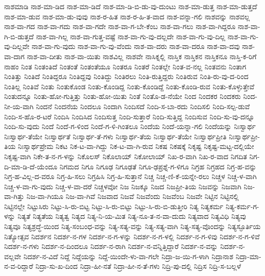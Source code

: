 {ನಾಶಮಾಡಿ
ನಾಶ-ಮಾ-ಡಿದ
ನಾಶ-ಮಾ-ಡಿದೆ
ನಾಶ-ಮಾ-ಡಿ-ಬಿ-ಡು-ವು-ದುಂಟು
ನಾಶ-ಮಾ-ಡುತ್ತ
ನಾಶ-ಮಾ-ಡುತ್ತದೆ
ನಾಶ-ಮಾ-ಡುವ
ನಾಶ-ಮಾ-ಡು-ವುವು
ನಾಶ-ರ-ಹಿತ
ನಾಶ-ರ-ಹಿ-ತ-ವಾದ
ನಾಶ-ವನ್ನಾ-ಗಲಿ
ನಾಶವನ್ನು
ನಾಶವಲ್ಲ
ನಾಶ-ವಾ-ಗದ
ನಾಶ-ವಾ-ಗದು
ನಾಶ-ವಾ-ಗದೇ
ನಾಶ-ವಾ-ಗ-ಬೇ-ಕೆಂಬ
ನಾಶ-ವಾ-ಗಲು
ನಾಶ-ವಾ-ಗಿದ್ದರೂ
ನಾಶ-ವಾ-ಗಿ-ಬಿ-ಡುತ್ತದೆ
ನಾಶ-ವಾ-ಗಿಲ್ಲ
ನಾಶ-ವಾ-ಗುತ್ತ-ವಷ್ಟೆ
ನಾಶ-ವಾ-ಗು-ವು-ದಲ್ಲದೇ
ನಾಶ-ವಾ-ಗು-ವು-ದಿಲ್ಲ
ನಾಶ-ವಾ-ಗು-ವು-ದಿಲ್ಲವೇ
ನಾಶ-ವಾ-ಗು-ವುದು
ನಾಶ-ವಾ-ಗು-ವು-ವೆಂದು
ನಾಶ-ವಾ-ದರು
ನಾಶ-ವಾ-ದರೂ
ನಾಶ-ವಾ-ದವು
ನಾಶ-ವಾ-ದಾಗ
ನಾಶ-ವಾ-ದೀತು
ನಾಶ-ವಾ-ಯಿತು
ನಾಶವಿಲ್ಲ
ನಾಶವೇ
ನಾಸಿಕ್ನಲ್ಲಿ
ನಾಸ್ತಿಕ
ನಾಸ್ತಿಕನ
ನಾಸ್ತಿಕನೂ
ನಾಸ್ತಿ-ಕ-ರಿಗೆ
ನಾಹಂ
ನಿಂತ
ನಿಂತಂತಿದೆ
ನಿಂತಂತೆ
ನಿಂತಂತೆಯೂ
ನಿಂತರೂ
ನಿಂತರೆ
ನಿಂತಲ್ಲೇ
ನಿಂತ-ವ-ನಲ್ಲ
ನಿಂತವನು
ನಿಂತಾಗ
ನಿಂತಿತ್ತು
ನಿಂತಿದೆ
ನಿಂತಿದ್ದರೂ
ನಿಂತಿದ್ದವು
ನಿಂತಿದ್ದು
ನಿಂತಿರಲು
ನಿಂತಿ-ರುತ್ತಿದ್ದರು
ನಿಂತಿರುವ
ನಿಂತಿ-ರು-ವು-ದ-ರಿಂದ
ನಿಂತಿಲ್ಲ
ನಿಂತಿವೆ
ನಿಂತು
ನಿಂತುಕೊಂಡ
ನಿಂತು-ಕೊಂಡಿದ್ದ
ನಿಂತು-ಕೊಂಡಿದ್ದೆ
ನಿಂತು-ಕೊಂಡಿ-ರುವ
ನಿಂತು-ಕೊಳ್ಳುತ್ತೇವೆ
ನಿಂತುದನ್ನೂ
ನಿಂತು-ಹೋ-ಗುತ್ತಿತ್ತು
ನಿಂತು-ಹೋ-ಯಿತು
ನಿಂತೆ
ನಿಂತೊ-ಡ-ನೆಯೇ
ನಿಂದ
ನಿಂದಕರ
ನಿಂದಕರು
ನಿಂದ-ನೀ-ಯ-ವಾಗಿ
ನಿಂದನೆ
ನಿಂದನೆಯ
ನಿಂದಲೂ
ನಿಂದಾಗಿ
ನಿಂದಿಸದೆ
ನಿಂದಿ-ಸ-ಬಾ-ರದು
ನಿಂದಿಸಲಿ
ನಿಂದಿ-ಸಲ್ಪ-ಡುವೆ
ನಿಂದಿ-ಸ-ಹೊ-ರ-ಟರೆ
ನಿಂದಿಸಿ
ನಿಂದಿಸಿದ
ನಿಂದಿಸುತ್ತ
ನಿಂದಿ-ಸುತ್ತಾರೆ
ನಿಂದಿ-ಸುತ್ತಿದ್ದ
ನಿಂದಿಸುವ
ನಿಂದಿ-ಸು-ವು-ದನ್ನೂ
ನಿಂದಿ-ಸು-ವುದು
ನಿಂದೆ
ನಿಂದೆ-ಗ-ಳಿಂದ
ನಿಂದೆ-ಗ-ಳಿ-ಗಿಂತಲೂ
ನಿಂದೆಯ
ನಿಂದೆ-ಯನ್ನಾ-ಗಲಿ
ನಿಂದೆಯನ್ನು
ನಿಃಸ್ವಾರ್ಥ
ನಿಃಸ್ವಾರ್ಥ-ತೆಯೇ
ನಿಃಸ್ವಾರ್ಥತೆ
ನಿಃಸ್ವಾರ್ಥ-ತೆ-ಗಳು
ನಿಃಸ್ವಾರ್ಥ-ತೆಯ
ನಿಃಸ್ವಾರ್ಥ-ತೆಯೇ
ನಿಃಸ್ವಾರ್ಥಪ್ರೀತಿ
ನಿಃಸ್ವಾರ್ಥಪ್ರೀ-ತಿಯ
ನಿಃಸ್ವಾರ್ಥಪ್ರೇಮ
ನಿಕಟ
ನಿಕ-ಟ-ವಾ-ಗಿದ್ದು
ನಿಕ-ಟ-ವಾ-ಗಿ-ರುವ
ನಿಕಷ
ನಿಕಷಕ್ಕೆ
ನಿಕೃಷ್ಟ
ನಿಕೃಷ್ಟ-ಮಟ್ಟ-ದಲ್ಲಿಯೇ
ನಿಕೃಷ್ಟ-ವಾಗಿ
ನಿಕೇ-ತ-ನ-ಗ-ಳನ್ನು
ನಿಕೊಲಸ್
ನಿಕೊಲಾಯ್
ನಿಕೋಲಾಯ್
ನಿಖ-ರ-ವಾಗಿ
ನಿಖ-ರ-ವಾದ
ನಿಗದಿತ
ನಿಗ-ದಿ-ಮಾ-ಡಿ-ದೆ-ಯೆಂದೂ
ನಿಗಮದ
ನಿಗೂ
ನಿಗೂಢ
ನಿಗೂಢತೆ
ನಿಗೂ-ಢಪ್ರಶ್ನೆ-ಗ-ಳಿಗೂ
ನಿಗ್ರಹ
ನಿಗ್ರಹದ
ನಿಗ್ರ-ಹ-ವನ್ನು
ನಿಗ್ರ-ಹ-ವಿಲ್ಲ-ದ-ವರೂ
ನಿಗ್ರ-ಹಿ-ಸಲು
ನಿಗ್ರಹಿಸಿ
ನಿಗ್ರ-ಹಿ-ಸುತ್ತಾನೆ
ನಿಚ್ಚ
ನಿಚ್ಚ-ಣಿ-ಕೆ-ಯನ್ನೇ-ರಲು
ನಿಚ್ಚಳ
ನಿಚ್ಚ-ಳ-ವಾಗಿ
ನಿಚ್ಚ-ಳ-ವಾ-ಗು-ವುದು
ನಿಚ್ಚ-ಳ-ವಾ-ದರೆ
ನಿಚ್ಚಳವೋ
ನಿಜ
ನಿಜಕ್ಕೂ
ನಿಜದ
ನಿಜಪ್ರೀ-ತಿಯ
ನಿಜವನ್ನು
ನಿಜವಾಗಿ
ನಿಜ-ವಾ-ಗಿತ್ತು
ನಿಜ-ವಾ-ಗಿಯೂ
ನಿಜ-ವಾ-ಗಿವೆ
ನಿಜವಾದ
ನಿಜವೆ
ನಿಜವೆಂದು
ನಿಜವೆಂಬ
ನಿಜವೇ
ನಿಟ್ಟಿನ
ನಿಟ್ಟಿನಲ್ಲಿ
ನಿಟ್ಟಿನಲ್ಲೇ
ನಿಟ್ಟುಸಿರು
ನಿಟ್ಟು-ಸಿ-ರು-ಬಿಟ್ಟ
ನಿಟ್ಟು-ಸಿ-ರು-ಬಿಟ್ಟು
ನಿಟ್ಟು-ಸಿ-ರು-ಬಿ-ಡುತ್ತೀರಿ
ನಿತ್ಯ
ನಿತ್ಯಕರ್ಮ
ನಿತ್ಯ-ಕರ್ಮ-ಗ-ಳನ್ನು
ನಿತ್ಯತೆ
ನಿತ್ಯತೆಯ
ನಿತ್ಯತ್ವ
ನಿತ್ಯದ
ನಿತ್ಯ-ನಿ-ಯ-ಮಿತ
ನಿತ್ಯ-ನೂ-ತ-ನ-ವಾ-ದುದು
ನಿತ್ಯವಾದ
ನಿತ್ಯವಿಧಿ
ನಿತ್ಯವು
ನಿತ್ಯವೂ
ನಿತ್ಯಶ್ರದ್ಧೆ-ಯಿಂದ
ನಿತ್ಯ-ಸಂಬಂಧ-ವನ್ನು
ನಿತ್ಯ-ಸತ್ಯ-ವನ್ನು
ನಿತ್ಯ-ಸತ್ಯ-ವಾಗಿ
ನಿತ್ಯ-ಸತ್ಯ-ವೊಂದನ್ನು
ನಿತ್ಯಸ್ಫೂರ್ತಿಯ
ನಿತ್ಯೋತ್ಸವ
ನಿದರ್ಶನ
ನಿದರ್ಶ-ನ-ಗಳ
ನಿದರ್ಶ-ನ-ಗ-ಳನ್ನು
ನಿದರ್ಶ-ನ-ಗ-ಳಲ್ಲಿ
ನಿದರ್ಶ-ನ-ಗ-ಳಿವು
ನಿದರ್ಶ-ನ-ಗ-ಳಿವೆ
ನಿದರ್ಶ-ನ-ಗಳು
ನಿದರ್ಶ-ನ-ದಿಂದಲೂ
ನಿದರ್ಶ-ನ-ರಾಗಿ
ನಿದರ್ಶ-ನ-ವನ್ನಿತ್ತಿದ್ದಾರೆ
ನಿದರ್ಶ-ನ-ವನ್ನು
ನಿದರ್ಶ-ನ-ವಲ್ಲವೇ
ನಿದರ್ಶ-ನ-ವಿದೆ
ನಿದ್ದೆ
ನಿದ್ದೆಯನ್ನು
ನಿದ್ದೆ-ಯಿಂದೇ-ಳು-ವಾ-ಗಲೇ
ನಿದ್ರಾ-ಜ-ಯಿ-ಗ-ಳಾಗಿ
ನಿದ್ರಾನಾಶ
ನಿದ್ರಾ-ಮಾ-ನ-ವ-ರಿದ್ದಾರೆ
ನಿದ್ರಾ-ಸು-ಖ-ದಿಂದ
ನಿದ್ರಾ-ಹೀ-ನತೆ
ನಿದ್ರಾ-ಹೀ-ನ-ತೆ-ಗಳು
ನಿದ್ರಿ-ಪು-ದಲ್ಲಿ
ನಿದ್ರಿಸ
ನಿದ್ರಿ-ಸ-ಬಲ್ಲಳೆ
}

